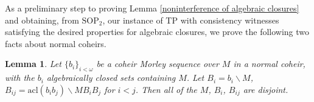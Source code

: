 \documentclass{amsart}
\newtheorem{lemma}[theorem]{Lemma}
\theoremstyle{definition}
\theoremstyle{remark}
\numberwithin{equation}{section}
\begin{document}
As a preliminary step to proving Lemma \ref{noninterference of algebraic closures} and obtaining, from $\mathrm{SOP}_{2}$, our instance of $\mathrm{TP}$ with consistency witnesses satisfying the desired properties for algebraic closures, we prove the following two facts about normal coheirs.



\begin{lemma}
\label{algebraic closures in normal coheir morely sequence}    Let $\{b_{i}\}_{i < \omega}$ be a coheir Morley sequence over $M$ in a normal coheir, with the $b_{i}$ algebraically closed sets containing $M$. Let $B_{i} = b_{i} \backslash M$, $B_{ij} = \mathrm{acl}(b_ib_j) \backslash MB_{i}B_{j}  $ for $i < j$. Then all of the $M$, $B_{i}$, $B_{ij}$ are disjoint.  
\end{lemma}
\end{document}
